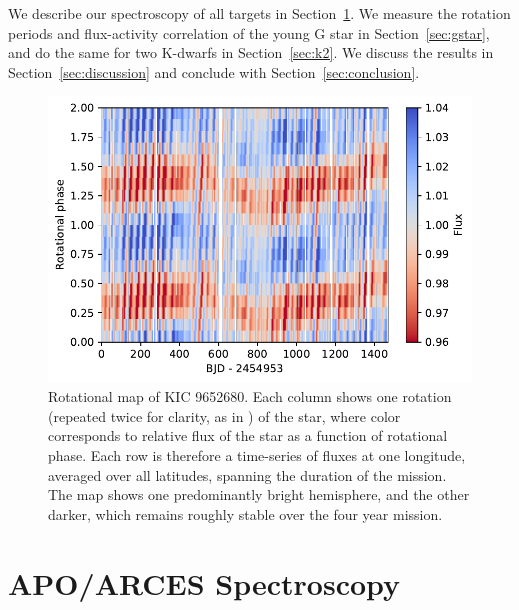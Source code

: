 We describe our spectroscopy of all targets in Section~\ref{sec:spectroscopy}. We measure the rotation periods and flux-activity correlation of the young G star in Section~\ref{sec:gstar}, and do the same for two K-dwarfs in Section~\ref{sec:k2}. We discuss the results in Section~\ref{sec:discussion} and conclude with Section~\ref{sec:conclusion}.

\begin{figure}
    \centering
    \includegraphics[scale=0.8]{nephelion/rotation_map.pdf}
    \caption{Rotational map of KIC 9652680. Each column shows one rotation (repeated twice for clarity, as in \citep{Davenport2015}) of the star, where color corresponds to relative flux of the star as a function of rotational phase. Each row is therefore a time-series of fluxes at one longitude, averaged over all latitudes, spanning the duration of the \kepler mission. The map shows one predominantly bright hemisphere, and the other darker, which remains roughly stable over the four year \kepler mission.}
    \label{fig:rotation}
\end{figure}

\section{APO/ARCES Spectroscopy} \label{sec:spectroscopy}


